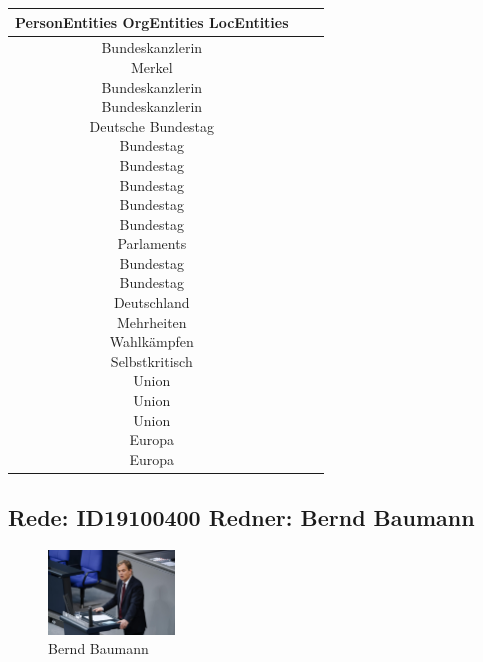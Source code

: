 \documentclass[a4paper,11pt]{article}
\begin{document}
\begin{table}[ht]
\centering
\begin{tabular}{||c | c | c||}
\hline
PersonEntities  OrgEntities  LocEntities \\ 

\hline\hline
\makecell{Bundeskanzlerin \\
Merkel \\
Bundeskanzlerin \\
Bundeskanzlerin \\
} 
\makecell{Deutsche Bundestag \\
Bundestag \\
Bundestag \\
Bundestag \\
Bundestag \\
Bundestag \\
Parlaments \\
Bundestag \\
Bundestag \\
} 
\makecell{Deutschland \\
Mehrheiten \\
Wahlkämpfen \\
Selbstkritisch \\
Union \\
Union \\
Union \\
Europa \\
Europa \\
}\\
\hline
\end{tabular}
\end{table}
\clearpage


\subsection{Rede: ID19100400  Redner: Bernd Baumann}

\begin{figure}[ht]

\centering

\includegraphics[width=0.3\textwidth]{Bernd_Baumann.jpg}

\caption{Bernd Baumann}

\end{figure}
\end{document}
